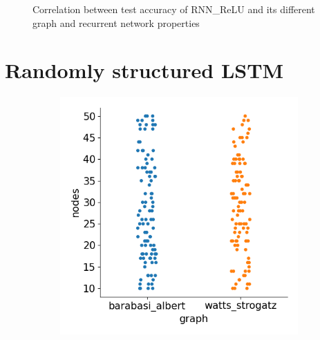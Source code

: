 \begin{figure}[H]
\caption[Correlation between test accuracy of RNN\_ReLU and its different graph and recurrent network properties - 1]{Correlation between test accuracy of RNN\_ReLU and its different graph and recurrent network properties} \label{fig:relu_correlation}
\end{figure}

\newpage
\section{Randomly structured LSTM}\label{app:rs_lstm}

\begin{figure}[H]
    \centering
    \begin{subfigure}{0.45\textwidth}
        \includegraphics[width=\linewidth]{images/results/random/lstm/graph_nodes.png}
        \caption{} \label{fig:lstm_graph_nodes}
    \end{subfigure}%
    \hfill
    \begin{subfigure}{0.45\textwidth}

\end{subfigure}
\end{figure}

